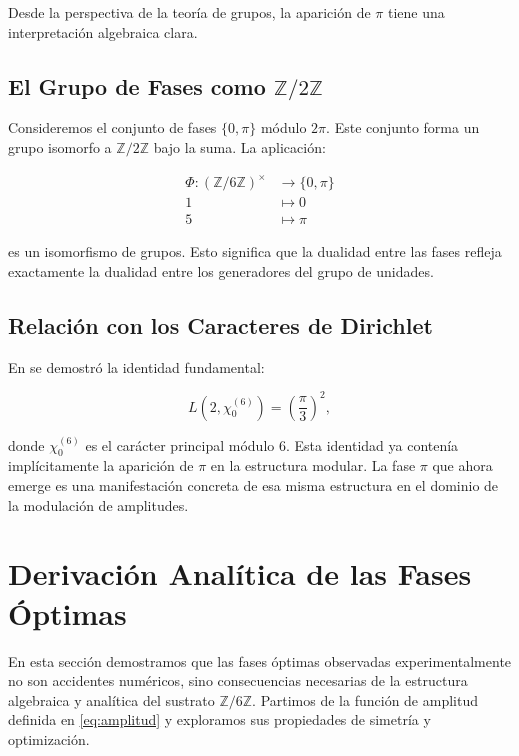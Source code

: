 \documentclass[12pt,a4paper]{article}
\theoremstyle{plain}
\theoremstyle{definition}
\theoremstyle{remark}
\newcommand{\Zmod}{\mathbb{Z}/6\mathbb{Z}}
\begin{document}
Desde la perspectiva de la teoría de grupos, la aparición de $\pi$ tiene una interpretación algebraica clara.

\subsection{El Grupo de Fases como $\mathbb{Z}/2\mathbb{Z}$}

Consideremos el conjunto de fases $\{0, \pi\}$ módulo $2\pi$. Este conjunto forma un grupo isomorfo a $\mathbb{Z}/2\mathbb{Z}$ bajo la suma. La aplicación:

\begin{align}
\Phi: (\mathbb{Z}/6\mathbb{Z})^{\times} &\to \{0,\pi\} \\
1 &\mapsto 0 \\
5 &\mapsto \pi
\end{align}

es un isomorfismo de grupos. Esto significa que la dualidad entre las fases refleja exactamente la dualidad entre los generadores del grupo de unidades.

\subsection{Relación con los Caracteres de Dirichlet}

En \cite{PeinadorSpectrum} se demostró la identidad fundamental:

\begin{equation}
L(2,\chi_0^{(6)}) = \left(\frac{\pi}{3}\right)^2,
\end{equation}

donde $\chi_0^{(6)}$ es el carácter principal módulo $6$. Esta identidad ya contenía implícitamente la aparición de $\pi$ en la estructura modular. La fase $\pi$ que ahora emerge es una manifestación concreta de esa misma estructura en el dominio de la modulación de amplitudes.

\section{Derivación Analítica de las Fases Óptimas}
\label{sec:derivacion}

En esta sección demostramos que las fases óptimas observadas experimentalmente no son accidentes numéricos, sino consecuencias necesarias de la estructura algebraica y analítica del sustrato $\Zmod$. Partimos de la función de amplitud definida en \eqref{eq:amplitud} y exploramos sus propiedades de simetría y optimización.
\end{document}
